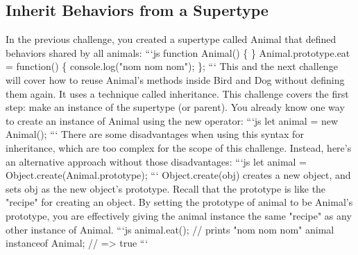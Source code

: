 \documentclass{article}%
\begin{document}
%
\subsection{Inherit Behaviors from a Supertype}%
\label{subsec:InheritBehaviorsfromaSupertype}%
In the previous challenge, you created a supertype called Animal that defined behaviors shared by all animals:\newline%
```js\newline%
function Animal() \{ \}\newline%
Animal.prototype.eat = function() \{\newline%
  console.log("nom nom nom");\newline%
\};\newline%
```\newline%
This and the next challenge will cover how to reuse Animal's methods inside Bird and Dog without defining them again. It uses a technique called inheritance.\newline%
This challenge covers the first step: make an instance of the supertype (or parent).\newline%
You already know one way to create an instance of Animal using the new operator:\newline%
```js\newline%
let animal = new Animal();\newline%
```\newline%
There are some disadvantages when using this syntax for inheritance, which are too complex for the scope of this challenge. Instead, here's an alternative approach without those disadvantages:\newline%
```js\newline%
let animal = Object.create(Animal.prototype);\newline%
```\newline%
Object.create(obj) creates a new object, and sets obj as the new object's prototype. Recall that the prototype is like the "recipe" for creating an object. By setting the prototype of animal to be Animal's prototype, you are effectively giving the animal instance the same "recipe" as any other instance of Animal.\newline%
```js\newline%
animal.eat(); // prints "nom nom nom"\newline%
animal instanceof Animal; // => true\newline%
```\newline%
\end{document}
